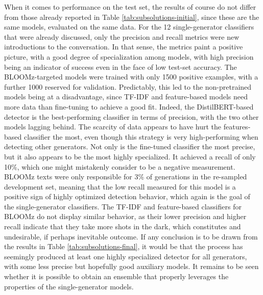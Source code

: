 When it comes to performance on the test set, the results of course do not differ from those already reported in Table \ref{tab:subsolutions-initial}, since these are the same models, evaluated on the same data.
For the 12 single-generator classifiers that were already discussed, only the precision and recall metrics were new introductions to the conversation.
In that sense, the metrics paint a positive picture, with a good degree of specialization among models, with high precision being an indicator of success even in the face of low test-set accuracy.
The BLOOMz-targeted models were trained with only 1500 positive examples, with a further 1000 reserved for validation.
Predictably, this led to the non-pretrained models being at a disadvantage, since TF-IDF and feature-based models need more data than fine-tuning to achieve a good fit.
Indeed, the DistilBERT-based detector is the best-performing classifier in terms of precision, with the two other models lagging behind.
The scarcity of data appears to have hurt the features-based classifier the most, even though this strategy is very high-performing when detecting other generators.
Not only is the fine-tuned classifier the most precise, but it also appears to be the most highly specialized.
It achieved a recall of only 10\%, which one might mistakenly consider to be a negative measurement.
BLOOMz texts were only responsible for 3\% of generations in the re-sampled development set, meaning that the low recall measured for this model is a positive sign of highly optimized detection behavior, which again is the goal of the single-generator classifiers.
The TF-IDF and feature-based classifiers for BLOOMz do not display similar behavior, as their lower precision and higher recall indicate that they take more shots in the dark, which constitutes and undesirable, if perhaps inevitable outcome.
If any conclusion is to be drawn from the results in Table \ref{tab:subsolutions-final}, it would be that the process has seemingly produced at least one highly specialized detector for all generators, with some less precise but hopefully good auxiliary models.
It remains to be seen whether it is possible to obtain an ensemble that properly leverages the properties of the single-generator models.

